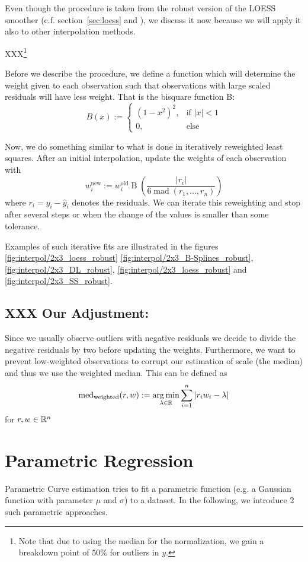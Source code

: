 Even though the procedure is taken from the robust version of the LOESS smoother (c.f. section~\ref{sec:loess} and \cite{clevelandRobustLocallyWeighted1979}), we discuss it now because we will apply it also to other interpolation methods.


XXX\footnote{Note that due to using the median for the normalization, we gain a breakdown point of $50 \%$ for outliers in $y$.}

Before we describe the procedure, we define a function which will determine the weight given to each observation such that observations with large scaled residuals will have less weight. That is the bisquare function B:
$$
  B(x):=\begin{cases}
    \left(1-x^{2}\right)^{2}, & \text{if } |x|<1 \\
    0,                        & \text{else }
  \end{cases}
$$

Now, we do something similar to what is done in iteratively reweighted least squares. After an initial interpolation, update the weights of each observation with
\begin{equation}
  w_i^\text{new}:=w_i^\text{old} \operatorname{B}\left(\frac{|r_i|}{6\operatorname{mad}\left(r_1,\dots,r_n\right)}\right)
  \label{eq:bisquare}
\end{equation}
where $r_i = y_i - \hat y_i$ denotes the residuals. We can iterate this reweighting and stop after several steps or when the change of the values is smaller than some tolerance.

Examples of such iterative fits are illustrated in the figures \ref{fig:interpol/2x3_loess_robust} \ref{fig:interpol/2x3_B-Splines_robust}, \ref{fig:interpol/2x3_DL_robust}, \ref{fig:interpol/2x3_loess_robust} and \ref{fig:interpol/2x3_SS_robust}.


\subsection{XXX Our Adjustment:} Since we usually observe outliers with negative residuals we decide to divide the negative residuals by two before updating the weights. Furthermore, we want to prevent low-weighted observations to corrupt our estimation of scale (the median) and thus we use the weighted median. This can be defined as
$$
  \operatorname{med}_\text{weighted}(r,w) := \operatorname*{arg\, min}_{\lambda \in \mathbb{R}} \sum_{i=1}^n |r_iw_i -\lambda|
$$
for $r,w\in \mathbb{R}^n$

\section{Parametric Regression}
Parametric Curve estimation tries to fit a parametric function (e.g. a Gaussian function with parameter $\mu$ and $\sigma$) to a dataset. In the following, we introduce 2 such parametric approaches.

